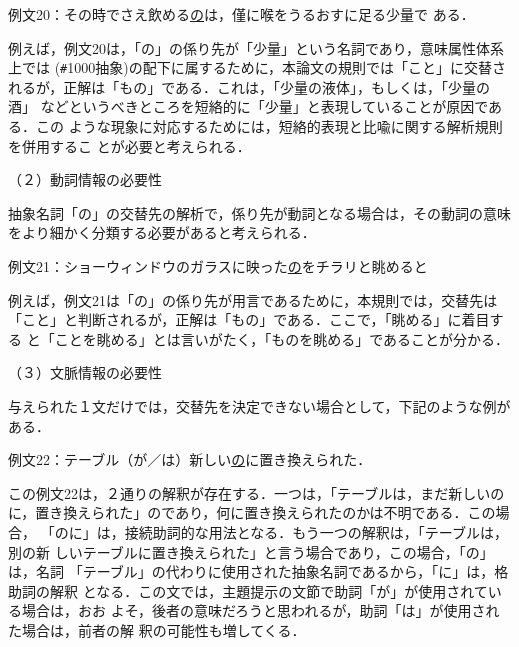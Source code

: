 \vspace{6pt}
例文20：その時でさえ飲める\underline{の}は，僅に喉をうるおすに足る少量で
ある．

\vspace{6pt}

例えば，例文20は，「の」の係り先が「少量」という名詞であり，意味属性体系
上では ({\verb+#+}1000抽象)の配下に属するために，本論文の規則では「こと」に交替さ
れるが，正解は「もの」である．これは，「少量の液体」，もしくは，「少量の酒」
などというべきところを短絡的に「少量」と表現していることが原因である．この
ような現象に対応するためには，短絡的表現と比喩に関する解析規則を併用するこ
とが必要と考えられる．

\vspace{6pt}

（２）動詞情報の必要性

抽象名詞「の」の交替先の解析で，係り先が動詞となる場合は，その動詞の意味
をより細かく分類する必要があると考えられる．

\vspace{6pt}

例文21：ショーウィンドウのガラスに映った\underline{の}をチラリと眺めると

\vspace{6pt}

例えば，例文21は「の」の係り先が用言であるために，本規則では，交替先は
「こと」と判断されるが，正解は「もの」である．ここで，「眺める」に着目する
と「ことを眺める」とは言いがたく，「ものを眺める」であることが分かる．

\vspace{6pt}
（３）文脈情報の必要性

与えられた１文だけでは，交替先を決定できない場合として，下記のような例が
ある．

\vspace{6pt}

例文22：テーブル（が／は）新しい\underline{の}に置き換えられた．

\vspace{6pt}

この例文22は，２通りの解釈が存在する．一つは，「テーブルは，まだ新しいの
に，置き換えられた」のであり，何に置き換えられたのかは不明である．この場合，
「のに」は，接続助詞的な用法となる．もう一つの解釈は，「テーブルは，別の新
しいテーブルに置き換えられた」と言う場合であり，この場合，「の」は，名詞
「テーブル」の代わりに使用された抽象名詞であるから，「に」は，格助詞の解釈
となる．この文では，主題提示の文節で助詞「が」が使用されている場合は，おお
よそ，後者の意味だろうと思われるが，助詞「は」が使用された場合は，前者の解
釈の可能性も増してくる．

